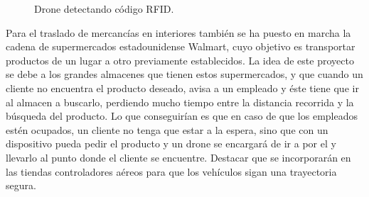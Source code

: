 \begin{figure}[H]
 \centering
 \caption{Drone detectando c\'odigo RFID.}
 \label{f:Drone detecta codigo RFID}
\end{figure} 


\hspace{1 cm} Para el traslado de mercanc\'ias en interiores tambi\'en se ha puesto en marcha la cadena de supermercados estadounidense Walmart, cuyo objetivo es transportar productos de un lugar a otro previamente establecidos. La idea de este proyecto se debe a los grandes almacenes que tienen estos supermercados, y que cuando un cliente no encuentra el producto deseado, avisa a un empleado y \'este tiene que ir al almacen a buscarlo, perdiendo mucho tiempo entre la distancia recorrida y la b\'usqueda del producto. Lo que conseguir\'ian es que en caso de que los empleados est\'en ocupados, un cliente no tenga que estar a la espera, sino que con un dispositivo pueda pedir el producto y un drone se encargar\'a de ir a por el y llevarlo al punto donde el cliente se encuentre. Destacar que se incorporar\'an en las tiendas controladores a\'ereos para que los veh\'iculos sigan una trayectoria segura.  



